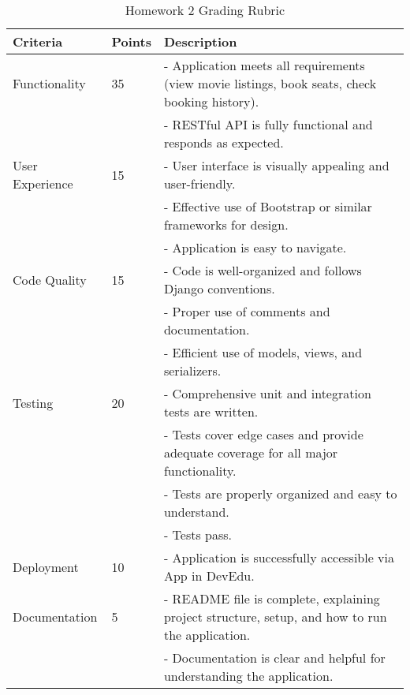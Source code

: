 \documentclass{article}
\begin{document}
\begin{table}[ht]
\centering
\small
\begin{tabular}{l l p{8cm}}
\hline
\textbf{Criteria} & \textbf{Points} & \textbf{Description} \\
\hline
Functionality &
35 &
- Application meets all requirements (view movie listings, book seats, check booking history).\\
& &
- RESTful API is fully functional and responds as expected. \newline \\
User Experience &
15 &
- User interface is visually appealing and user-friendly.\\
& &
- Effective use of Bootstrap or similar frameworks for design.\\
& &
- Application is easy to navigate. \newline \\
Code Quality &
15 &
- Code is well-organized and follows Django conventions. \\
& &
- Proper use of comments and documentation. \\
& &
- Efficient use of models, views, and serializers. \newline \\
Testing &
20 &
- Comprehensive unit and integration tests are written.\\
& &
- Tests cover edge cases and provide adequate coverage for all major functionality.\\
& &
- Tests are properly organized and easy to understand. \\
& & 
- Tests pass. \newline \\

Deployment &
10 &
- Application is successfully accessible via App in DevEdu. \newline \\ 
Documentation &
5 &
- README file is complete, explaining project structure, setup, and how to run the application.\\
& &
- Documentation is clear and helpful for understanding the application.\\
\hline
\end{tabular}
\caption{Homework 2 Grading Rubric}
\end{table}
\end{document}
